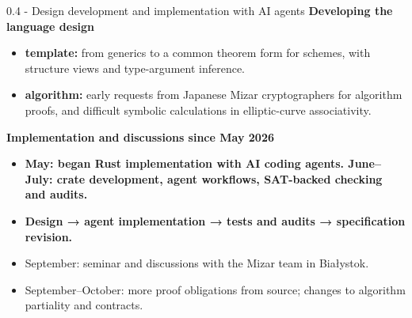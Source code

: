 \documentclass[aspectratio=169,11pt]{beamer}
\begin{document}
\begin{frame}[fragile,t]{0.4 - Design development and implementation with AI agents}
\smallskip
\textbf{Developing the language design}
\begin{itemize}
\setlength{\itemsep}{1pt}
\setlength{\parsep}{0pt}
\setlength{\parskip}{0pt}
\item \textcolor{blue!55!black}{\textbf{template:}} from generics to a common theorem form for schemes, with structure views and type-argument inference.
\item \textcolor{blue!55!black}{\textbf{algorithm:}} early requests from Japanese Mizar cryptographers for algorithm proofs, and difficult symbolic calculations in elliptic-curve associativity.
\end{itemize}
\smallskip
\textbf{Implementation and discussions since May 2026}
\begin{itemize}
\setlength{\itemsep}{1pt}
\setlength{\parsep}{0pt}
\setlength{\parskip}{0pt}
\item \textcolor{blue!55!black}{\textbf{May: began Rust implementation with AI coding agents. June–July: crate development, agent workflows, SAT-backed checking and audits.}}
\item \textcolor{blue!55!black}{\textbf{Design → agent implementation → tests and audits → specification revision.}}
\item September: seminar and discussions with the Mizar team in Bia\l{}ystok.
\item September–October: more proof obligations from source; changes to algorithm partiality and contracts.
\end{itemize}
\end{frame}
\end{document}

